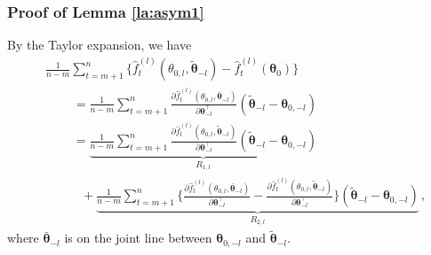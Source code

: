 \documentclass[12pt]{article}
\newcommand{\btheta}{\boldsymbol \theta}
\def\T{{\scriptscriptstyle \top} }
\newcommand{\0}{{\bf 0}}
\begin{document}
\subsubsection{Proof of Lemma \ref{la:asym1}}\label{pf:laasymp1}

By the Taylor expansion, we have
\begin{align*}
&\frac{1}{n-m}\sum_{t=m+1}^n\big\{\hat{f}_t^{(l)}(\theta_{0,l},\tilde{\btheta}_{-l})-\hat{f}_t^{(l)}(\btheta_0)\big\}\\
&~~~~~~~~~~=\frac{1}{n-m}\sum_{t=m+1}^n\frac{\partial\hat{f}_t^{(l)}(\theta_{0,l},\bar{\btheta}_{-l})}{\partial\btheta_{-l}^{\T}}(\tilde{\btheta}_{-l}-\btheta_{0,-l})\\
&~~~~~~~~~~=\underbrace{\frac{1}{n-m}\sum_{t=m+1}^n\frac{\partial\hat{f}_t^{(l)}(\theta_{0,l},\tilde{\btheta}_{-l})}{\partial\btheta_{-l}^{\T}}(\tilde{\btheta}_{-l}-\btheta_{0,-l})}_{R_{1,l}}\\
&~~~~~~~~~~~~~+\underbrace{\frac{1}{n-m}\sum_{t=m+1}^n\bigg\{\frac{\partial\hat{f}_t^{(l)}(\theta_{0,l},\bar{\btheta}_{-l})}{\partial\btheta_{-l}^{\T}}-\frac{\partial\hat{f}_t^{(l)}(\theta_{0,l},\tilde{\btheta}_{-l})}{\partial\btheta_{-l}^{\T}}\bigg\}(\tilde{\btheta}_{-l}-\btheta_{0,-l})}_{R_{2,l}}\,,
\end{align*}
where $\bar{\btheta}_{-l}$ is on the joint line between $\btheta_{0,-l}$ and $\tilde{\btheta}_{-l}$. %
\end{document}
